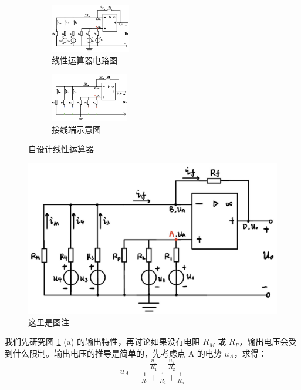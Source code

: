 \documentclass[a4paper]{article}  %
\theoremstyle{MyLineTheoremStyle} %
\theoremstyle{MyBlockTheoremStyle} %
\theoremstyle{MySubsubsectionStyle} %
\begin{document}
\begin{multicols*}{4}
\begin{figure}[H]\centering
\begin{subfigure}[t]{0.49\columnwidth}\centering
    \includegraphics[height=60pt]{assets/线性运算器.png}
    \caption{ 线性运算器电路图 }
\end{subfigure}\begin{subfigure}[t]{0.49\columnwidth}\centering
    \includegraphics[height=60pt]{assets/线性运算器接线端.png}
    \caption{ 接线端示意图 }
\end{subfigure}
\caption{ 自设计线性运算器 }\label{自设计线性运算器}
\end{figure}

\lipsum[3-4]    %
\begin{figure}[H]\centering
\includegraphics[width=0.8\columnwidth]{assets/线性运算器.png}
\caption{ 这里是图注}\label{这里是图注}
\end{figure}

我们先研究图 \ref{自设计线性运算器} (a) 的输出特性，再讨论如果没有电阻 $R_M$ 或 $R_P$，输出电压会受到什么限制。输出电压的推导是简单的，先考虑点 A 的电势 $u_A$，求得：
\begin{equation}
u_A = \frac{\frac{u_1}{R_1} + \frac{u_2}{R_2}}{\frac{1}{R_1} + \frac{1}{R_2} + \frac{1}{R_p}}
\end{equation}


\end{multicols*}
\end{document}
